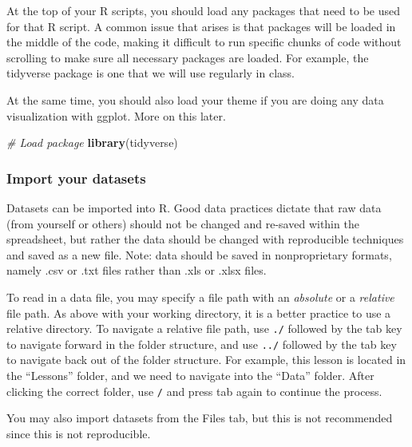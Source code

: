 \documentclass[]{article}
\newenvironment{Shaded}{\begin{snugshade}}{\end{snugshade}}
\newcommand{\CommentTok}[1]{\textcolor[rgb]{0.56,0.35,0.01}{\textit{#1}}}
\newcommand{\KeywordTok}[1]{\textcolor[rgb]{0.13,0.29,0.53}{\textbf{#1}}}
\newcommand{\NormalTok}[1]{#1}
\begin{document}
At the top of your R scripts, you should load any packages that need to
be used for that R script. A common issue that arises is that packages
will be loaded in the middle of the code, making it difficult to run
specific chunks of code without scrolling to make sure all necessary
packages are loaded. For example, the tidyverse package is one that we
will use regularly in class.

At the same time, you should also load your theme if you are doing any
data visualization with ggplot. More on this later.

\begin{Shaded}
\begin{Highlighting}[]
\CommentTok{# Load package}
\KeywordTok{library}\NormalTok{(tidyverse)}
\end{Highlighting}
\end{Shaded}

\hypertarget{import-your-datasets}{%
\subsubsection{Import your datasets}\label{import-your-datasets}}

Datasets can be imported into R. Good data practices dictate that raw
data (from yourself or others) should not be changed and re-saved within
the spreadsheet, but rather the data should be changed with reproducible
techniques and saved as a new file. Note: data should be saved in
nonproprietary formats, namely .csv or .txt files rather than .xls or
.xlsx files.

To read in a data file, you may specify a file path with an
\emph{absolute} or a \emph{relative} file path. As above with your
working directory, it is a better practice to use a relative directory.
To navigate a relative file path, use \texttt{./} followed by the tab
key to navigate forward in the folder structure, and use \texttt{../}
followed by the tab key to navigate back out of the folder structure.
For example, this lesson is located in the ``Lessons'' folder, and we
need to navigate into the ``Data'' folder. After clicking the correct
folder, use \texttt{/} and press tab again to continue the process.

You may also import datasets from the Files tab, but this is not
recommended since this is not reproducible.
\end{document}

